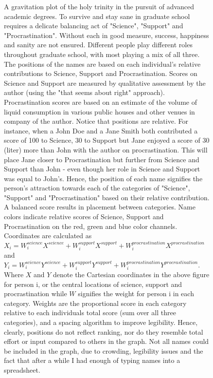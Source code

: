 \documentclass[b5paper,justified]{tufte-book} %
\begin{document}
\begin{fullwidth}
\begin{figure}
\vspace*{-2cm}\hspace*{2cm}
\begin{minipage}{14cm}
\footnotesize
\vspace{0.2cm}
A gravitation plot of the holy trinity in the pursuit of advanced academic degrees. To survive and stay sane in graduate school requires a delicate balancing act of "Science", "Support" and "Procrastination". Without each in good measure, success, happiness and sanity are not ensured.  Different people play different roles throughout graduate school, with most playing a mix of all three. The positions of the names are based on each individual's relative contributions to Science, Support and Procrastination. Scores on Science and Support are measured by qualitative assessment by the author (using the "that seems about right" approach). Procrastination scores are based on an estimate of the volume of liquid consumption in various public houses and other venues in company of the author. Notice that positions are relative.  For instance, when a John Doe and a Jane Smith both contributed a score of 100 to Science, 30 to Support but Jane enjoyed a score of 30 (liter) more than John with the author on procrastination. This will place Jane closer to Procrastination but further from Science and Support than John - even though her role in Science and Support was equal to John's. Hence, the position of each name signifies the person's attraction towards each of the categories of "Science", "Support" and "Procrastination" based on their relative contribution. A balanced score results in placement between categories. Name colors indicate relative scores of Science, Support and Procrastination on the red, green and blue color channels.  Coordinates are calculated as 
$X_i =  W^{science}_i X^{science} + W^{support}_i  X^{support} + W^{procrastination}_i  X^{procrastination}$ and $Y_i =  W^{science}_i  Y^{science} + W^{support}_i Y^{support} + W^{procrastination}_i  Y^{procrastination}$. Where $X$ and $Y$ denote the Cartesian coordinates in the above figure for person i, or the central locations of science, support and procrastination while $W$ signifies the weight for person i in each category. Weights are the proportional score in each category relative to each individuals total score (sum over all three categories), and a spacing algorithm to improve legibility. Hence, clearly, positions do not reflect ranking, nor do they resemble total effort or input compared to others in the graph. Not all names could be included in the graph, due to crowding, legibility issues and the fact that after a while I had enough of typing names into a spreadsheet. \\


\end{minipage}
\end{figure}
\end{fullwidth}
\end{document}
